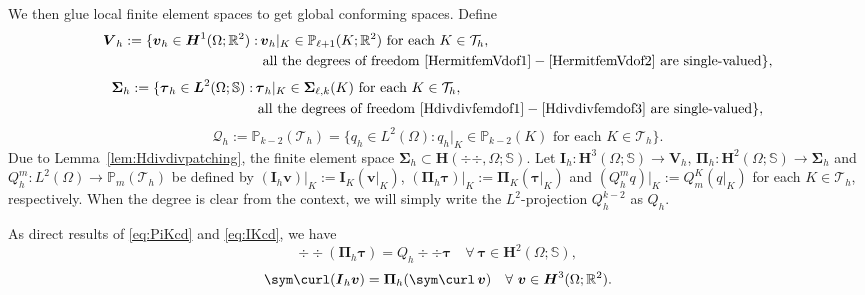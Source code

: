 We then glue local finite element spaces to get global conforming spaces.
Define
\begin{align*}
\boldsymbol  V_h:=\{\boldsymbol  v_h\in \boldsymbol  H^1(\Omega;\mathbb R^2):&\, \boldsymbol  v_h|_K\in \mathbb P_{\ell+1}(K;\mathbb R^2) \textrm{ for each } K\in\mathcal T_h, \\
& \textrm{ all the degrees of freedom } \eqref{HermitfemVdof1}-\eqref{HermitfemVdof2}  \textrm{ are single-valued}\},
\end{align*}
\begin{align*}
\boldsymbol\Sigma_h:=\{\boldsymbol \tau_h\in \boldsymbol  L^2(\Omega;\mathbb S):&\, \boldsymbol \tau_h|_K\in \boldsymbol \Sigma_{\ell,k}(K) \textrm{ for each } K\in\mathcal T_h, \\
& \textrm{ all the degrees of freedom } \eqref{Hdivdivfemdof1}-\eqref{Hdivdivfemdof3} \textrm{ are single-valued}\},
\end{align*}
\[
\mathcal Q_h :=\mathbb P_{k-2}(\mathcal T_h)=\{q_h\in L^2(\Omega): q_h|_K\in \mathbb P_{k-2}(K) \textrm{ for each } K\in\mathcal T_h\}.
\]
Due to Lemma~\ref{lem:Hdivdivpatching}, the finite element space $\boldsymbol \Sigma_h\subset\boldsymbol{H}(\div{\div },\Omega; \mathbb{S})$.
Let $\boldsymbol  I_h: \boldsymbol{H}^3(\Omega; \mathbb{S})\to\boldsymbol V_h$, $\boldsymbol \Pi_h: \boldsymbol{H}^2(\Omega; \mathbb{S})\to\boldsymbol\Sigma_h$ and $Q_h^{m}: L^2(\Omega)\to\mathbb P_{m}(\mathcal T_h)$ be defined by $(\boldsymbol  I_h\boldsymbol  v)|_K:=\boldsymbol  I_K(\boldsymbol  v|_K)$, $(\boldsymbol \Pi_h\boldsymbol \tau)|_K:=\boldsymbol \Pi_K(\boldsymbol \tau|_K)$  and $(Q_h^{m} q)|_K:=Q_{m}^K(q|_K)$ for each $K\in\mathcal T_h$, respectively. When the degree is clear from the context, we will simply write the $L^2$-projection $Q_h^{k-2}$ as $Q_h$.

As direct results of \eqref{eq:PiKcd} and \eqref{eq:IKcd}, we have
\begin{equation}\label{eq:Pihcd}
\div\div(\boldsymbol \Pi_h\boldsymbol \tau)=Q_{h}\div\div\boldsymbol \tau\quad\forall~\boldsymbol \tau\in\boldsymbol{H}^2(\Omega; \mathbb{S}),
\end{equation}
\begin{equation}\label{eq:Ihcd}
\sym\curl(\boldsymbol  I_h\boldsymbol  v)=\boldsymbol \Pi_h(\sym\curl \, \boldsymbol  v) \quad\forall~\boldsymbol  v\in\boldsymbol{H}^3(\Omega; \mathbb{R}^2).
\end{equation}

